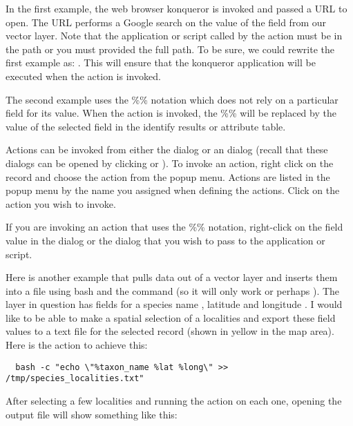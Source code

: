 In the first example, the web browser konqueror is invoked and passed a URL to
open. The URL performs a Google search on the value of the  field
from our vector layer. Note that the application or script called by the
action must be in the path or you must provided the full path. To be sure, we could
rewrite the first example as: . This will ensure that the konqueror
application will be executed when the action is invoked.

The second example uses the \%\% notation which does not rely on a particular
field for its value. When the action is invoked, the \%\% will be replaced by
the value of the selected field in the identify results or attribute table.

\label{label_usingactions}

Actions can be invoked from either the  dialog or an
 dialog (recall that these dialogs can be opened by
clicking  or
). To invoke an action,
right click on the record and choose the action from the popup menu. Actions
are listed in the popup menu by the name you assigned when defining the
actions. Click on the action you wish to invoke.

If you are invoking an action that uses the \%\% notation, right-click on the
field value in the  dialog or the
 dialog that you wish to pass to the application or script.

Here is another example that pulls data out of a vector layer and inserts them
into a file using bash and the  command (so it will only work
\nix or perhaps \osx). The layer in question has fields for a species name
, latitude  and longitude
. I would like to be able to
make a spatial selection of a localities and export these field values to a
text file for the selected record (shown in yellow in the \qg map area). Here is
the action to achieve this:

\begin{verbatim}
  bash -c "echo \"%taxon_name %lat %long\" >> /tmp/species_localities.txt"
\end{verbatim}

After selecting a few localities and running the action on each one, opening
the output file will show something like this:

